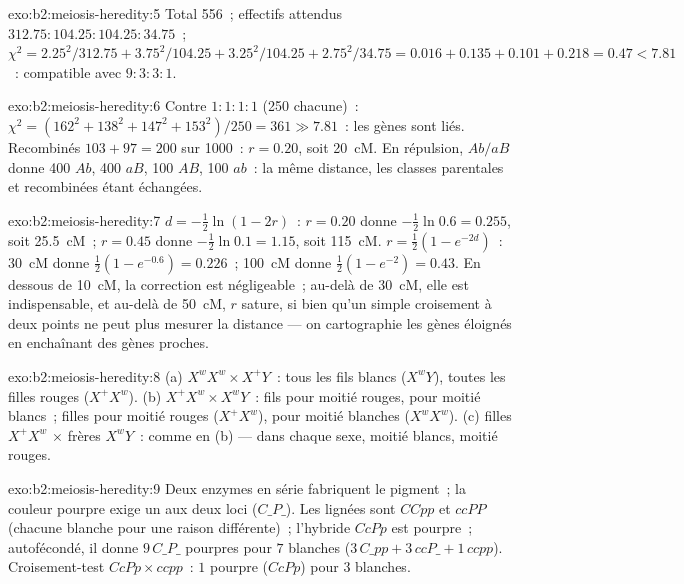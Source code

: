 \begin{solution}{exo:b2:meiosis-heredity:5}
Total 556~; effectifs attendus $312.75 : 104.25 : 104.25 : 34.75$~; $\chi^2 =
2.25^2/312.75 + 3.75^2/104.25 + 3.25^2/104.25 + 2.75^2/34.75 = 0.016
+ 0.135 + 0.101 + 0.218 = 0.47 < 7.81$~: compatible avec $9 : 3 : 3 :
1$.
\end{solution}

\begin{solution}{exo:b2:meiosis-heredity:6}
Contre $1 : 1 : 1 : 1$ (250 chacune)~: $\chi^2 = (162^2 + 138^2 + 147^2
+ 153^2)/250 = 361 \gg 7.81$~: les gènes sont liés. Recombinés $103 + 97 = 200$
sur 1000~: $r = 0.20$, soit \qty{20}{cM}. En répulsion, $Ab/aB$ donne 400
$Ab$, 400 $aB$, 100 $AB$, 100 $ab$~: la même distance, les classes
parentales et recombinées étant échangées.
\end{solution}

\begin{solution}{exo:b2:meiosis-heredity:7}
$d = -\tfrac12\ln(1 - 2r)$~: $r = 0.20$ donne $-\tfrac12\ln 0.6 =
0.255$, soit \qty{25.5}{cM}~; $r = 0.45$ donne $-\tfrac12\ln 0.1 = 1.15$,
soit \qty{115}{cM}. $r = \tfrac12(1 - e^{-2d})$~: \qty{30}{cM} donne
$\tfrac12(1 - e^{-0.6}) = 0.226$~; \qty{100}{cM} donne $\tfrac12(1 -
e^{-2}) = 0.43$. En dessous de \qty{10}{cM}, la correction est
négligeable~; au-delà de \qty{30}{cM}, elle est indispensable, et
au-delà de \qty{50}{cM}, $r$ sature, si bien qu'un simple croisement à
deux points ne peut plus mesurer la distance --- on cartographie les
gènes éloignés en enchaînant des gènes proches.
\end{solution}

\begin{solution}{exo:b2:meiosis-heredity:8}
(a) $X^wX^w \times X^+Y$~: tous les fils blancs ($X^wY$), toutes les
filles rouges ($X^+X^w$). (b) $X^+X^w \times X^wY$~: fils pour moitié
rouges, pour moitié blancs~; filles pour moitié rouges ($X^+X^w$), pour
moitié blanches ($X^wX^w$). (c) filles
$X^+X^w$ $\times$ frères $X^wY$~: comme en (b) --- dans chaque sexe,
moitié blancs, moitié rouges.
\end{solution}

\begin{solution}{exo:b2:meiosis-heredity:9}
Deux enzymes en série fabriquent le pigment~; la couleur pourpre exige
un   aux deux loci ($C\_P\_$). Les lignées sont $CCpp$ et
$ccPP$ (chacune blanche pour une raison différente)~; l'hybride $CcPp$
est pourpre~; autofécondé, il donne $9\,C\_P\_$ pourpres pour $7$
blanches ($3\,C\_pp + 3\,ccP\_ +
1\,ccpp$). Croisement-test $CcPp\times ccpp$~: $1$ pourpre ($CcPp$) pour
$3$ blanches.
\end{solution}

